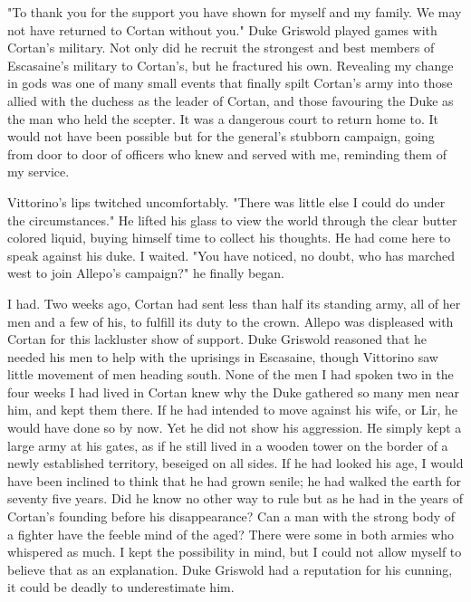 \documentclass{article}
\begin{document}
"To thank you for the support you have shown for myself and my family. We may not have returned to Cortan without you." Duke Griswold played games with Cortan's military. Not only did he recruit the strongest and best members of Escasaine's military to Cortan's, but he fractured his own. Revealing my change in gods was one of many small events that finally spilt Cortan's army into those allied with the duchess as the leader of Cortan, and those favouring the Duke as the man who held the scepter. It was a dangerous court to return home to. It would not have been possible but for the general's stubborn campaign, going from door to door of officers who knew and served with me, reminding them of my service.

Vittorino's lips twitched uncomfortably. "There was little else I could do under the circumstances." He lifted his glass to view the world through the clear butter colored liquid, buying himself time to collect his thoughts. He had come here to speak against his duke. I waited. "You have noticed, no doubt, who has marched west to join Allepo's campaign?" he finally began.

I had. Two weeks ago, Cortan had sent less than half its standing army, all of her men and a few of his, to fulfill its duty to the crown. Allepo was displeased with Cortan for this lackluster show of support. Duke Griswold reasoned that he needed his men to help with the uprisings in Escasaine, though Vittorino saw little movement of men heading south. None of the men I had spoken two in the four weeks I had lived in Cortan knew why the Duke gathered so many men near him, and kept them there. If he had intended to move against his wife, or Lir, he would have done so by now. Yet he did not show his aggression. He simply kept a large army at his gates, as if he still lived in a wooden tower on the border of a newly established territory, beseiged on all sides. If he had looked his age, I would have been inclined to think that he had grown senile; he had walked the earth for seventy five years. Did he know no other way to rule but as he had in the years of Cortan's founding before his disappearance? Can a man with the strong body of a fighter have the feeble mind of the aged? There were some in both armies who whispered as much. I kept the possibility in mind, but I could not allow myself to believe that as an explanation. Duke Griswold had a reputation for his cunning, it could be deadly to underestimate him.
\end{document}
